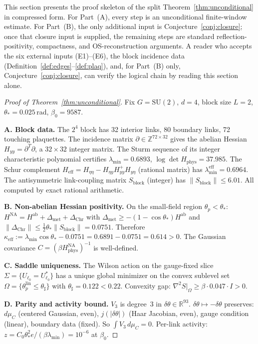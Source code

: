 \documentclass[11pt]{article}
\theoremstyle{definition}
\newcommand{\SU}{\mathrm{SU}}
\newcommand{\R}{\mathbb{R}}
\newcommand{\Z}{\mathbb{Z}}
\begin{document}
This section presents the proof skeleton of the split
Theorem~\ref{thm:unconditional} in compressed form.
For Part~(A), every step is an unconditional finite-window estimate.
For Part~(B), the only additional input is Conjecture~\ref{conj:closure};
once that closure input is supplied, the remaining steps are standard
reflection-positivity, compactness, and OS-reconstruction arguments.
A reader who accepts the six external inputs (E1)--(E6), the block
incidence data (Definition~\ref{def:edges}--\ref{def:plaq}), and,
for Part~(B) only, Conjecture~\ref{conj:closure}, can verify the
logical chain by reading this section alone.

\begin{proof}[Proof of Theorem~\ref{thm:unconditional}]
Fix $G=\SU(2)$, $d=4$, block size $L=2$,
$\theta_*=0.025$\,rad, $\beta_0=9587$.

\medskip\noindent\textbf{A. Block data.}
The $2^4$ block has 32 interior links, 80 boundary links,
72 touching plaquettes.  The incidence matrix
$\partial\in\Z^{72\times 32}$ gives the abelian Hessian
$H_{yy}=\partial^T\partial$, a $32\times 32$ integer matrix.
The Sturm sequence of its integer characteristic polynomial
certifies $\lambda_{\min}=0.6893$, $\log\det H_{\mathrm{phys}}=37.985$.
The Schur complement $H_{\mathrm{eff}}=H_{\eta\eta}-H_{\eta y}H_{yy}^+H_{y\eta}$
(rational matrix) has $\lambda_{\min}^{\mathrm{eff}}=0.6964$.
The antisymmetric link-coupling matrix $S_{\mathrm{block}}$ (integer)
has $\|S_{\mathrm{block}}\|\le 6.01$.
All computed by exact rational arithmetic.

\medskip\noindent\textbf{B. Non-abelian Hessian positivity.}
On the small-field region $\theta_p<\theta_*$:
$H^{\mathrm{NA}}=H^{\mathrm{ab}}+\Delta_{\mathrm{met}}
+\Delta_{\mathrm{Chr}}$ with
$\Delta_{\mathrm{met}}\ge-(1-\cos\theta_*)H^{\mathrm{ab}}$ and
$\|\Delta_{\mathrm{Chr}}\|\le\frac{1}{2}\theta_*\|S_{\mathrm{block}}\|
=0.0751$.  Therefore
$\kappa_{\mathrm{eff}}:=\lambda_{\min}\cos\theta_*-0.0751
=0.6891-0.0751=0.614>0$.
The Gaussian covariance $C=(\beta H_{\mathrm{phys}}^{\mathrm{NA}})^{-1}$
is well-defined.

\medskip\noindent\textbf{C. Saddle uniqueness.}
The Wilson action on the gauge-fixed slice
$\Sigma=\{U_{\ell_0}=U_{\ell_0}^*\}$ has a unique
global minimizer on the convex sublevel set
$\Omega=\{\theta_p^{\mathrm{lin}}\le\theta_\sharp\}$
with $\theta_\sharp=0.122<0.22$.
Convexity gap: $\nabla^2 S|_\Omega
\ge\beta\cdot 0.047\cdot I>0$.

\medskip\noindent\textbf{D. Parity and activity bound.}
$V_3$ is degree~3 in $\delta\theta\in\R^{93}$.
$\delta\theta\mapsto-\delta\theta$ preserves:
$d\mu_C$ (centered Gaussian, even), $j(|\delta\theta|)$
(Haar Jacobian, even), gauge condition (linear),
boundary data (fixed).  So $\int V_3\,d\mu_C=0$.
Per-link activity: $z=C_0\theta_*^2 e/(\beta\lambda_{\min})
=10^{-6}$ at $\beta_0$.


\end{proof}
\end{document}
